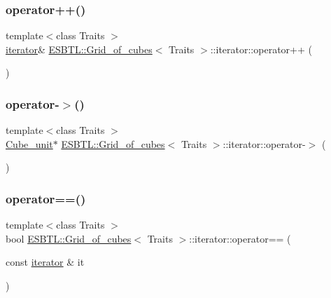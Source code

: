 \subsubsection{\texorpdfstring{operator++()}{operator++()}}
{\footnotesize\ttfamily template$<$class Traits $>$ \\
\hyperlink{classESBTL_1_1Grid__of__cubes_1_1iterator}{iterator}\& \hyperlink{structESBTL_1_1Grid__of__cubes}{E\+S\+B\+T\+L\+::\+Grid\+\_\+of\+\_\+cubes}$<$ Traits $>$\+::iterator\+::operator++ (\begin{DoxyParamCaption}{ }\end{DoxyParamCaption})\hspace{0.3cm}{\ttfamily [inline]}}

\mbox{\label{classESBTL_1_1Grid__of__cubes_1_1iterator_a6244a3042ab6bc853b3cf9b5d1b55969}} 
\subsubsection{\texorpdfstring{operator-\/$>$()}{operator->()}}
{\footnotesize\ttfamily template$<$class Traits $>$ \\
\hyperlink{structESBTL_1_1Grid__of__cubes_1_1Cube__unit}{Cube\+\_\+unit}$\ast$ \hyperlink{structESBTL_1_1Grid__of__cubes}{E\+S\+B\+T\+L\+::\+Grid\+\_\+of\+\_\+cubes}$<$ Traits $>$\+::iterator\+::operator-\/$>$ (\begin{DoxyParamCaption}{ }\end{DoxyParamCaption})\hspace{0.3cm}{\ttfamily [inline]}}

\mbox{\label{classESBTL_1_1Grid__of__cubes_1_1iterator_a94ea652fb193dcb86f982a42ebf6d0cb}} 
\subsubsection{\texorpdfstring{operator==()}{operator==()}}
{\footnotesize\ttfamily template$<$class Traits $>$ \\
bool \hyperlink{structESBTL_1_1Grid__of__cubes}{E\+S\+B\+T\+L\+::\+Grid\+\_\+of\+\_\+cubes}$<$ Traits $>$\+::iterator\+::operator== (\begin{DoxyParamCaption}\item[{const \hyperlink{classESBTL_1_1Grid__of__cubes_1_1iterator}{iterator} \&}]{it }\end{DoxyParamCaption})\hspace{0.3cm}{\ttfamily [inline]}}



